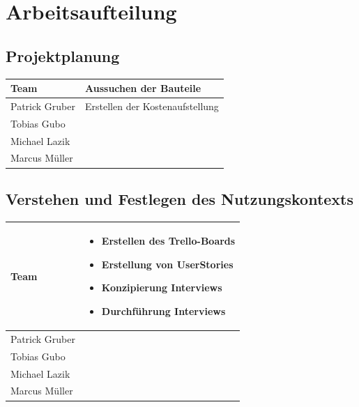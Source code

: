 \documentclass[12pt, a4paper]{scrartcl}
\begin{document}
	\newpage
	
	\section{Arbeitsaufteilung}
	\subsection*{Projektplanung}
	\begin{tabularx}{0.95\textwidth}{|l|X|}
		\hline
		Team & Aussuchen der Bauteile\\
		\hline
		Patrick Gruber & Erstellen der Kostenaufstellung\\
		\hline
		Tobias Gubo & \\
		\hline
		Michael Lazik & \\
		\hline
		Marcus Müller & \\
		\hline
	\end{tabularx}
	
	\subsection*{Verstehen und Festlegen des Nutzungskontexts}
	\begin{tabularx}{0.95\textwidth}{|l|X|}
		\hline
		Team & \begin{itemize}
			\setlength{\itemsep}{-0.5em}
			\item Erstellen des Trello-Boards
			\item Erstellung von UserStories
			\item Konzipierung Interviews
			\item Durchführung Interviews 
		\end{itemize}\\
		\hline
		Patrick Gruber & \\
		\hline
		Tobias Gubo & \\
		\hline
		Michael Lazik & \\
		\hline
		Marcus Müller & \\
		\hline
	\end{tabularx}
\end{document}

